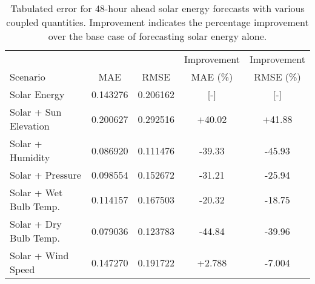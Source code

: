   \begin{table*}[t]
    \centering
    \caption{Tabulated error for 48-hour ahead solar energy forecasts with various coupled quantities. Improvement indicates the percentage improvement over the base case of forecasting solar energy alone.}
    \label{tab:solar48}
    \begin{tabular}{l|c|c|c|c}
      &  & & Improvement & Improvement \\
      Scenario  & MAE & RMSE & MAE (\%) & RMSE (\%)\\
      \hline
      Solar Energy & 0.143276 & 0.206162 & [-] & [-] \\
      Solar + Sun Elevation & 0.200627 & 0.292516 & +40.02 & +41.88\\
      Solar + Humidity & 0.086920 & 0.111476 & -39.33& -45.93\\
      Solar + Pressure & 0.098554 & 0.152672 &-31.21& -25.94\\
      Solar + Wet Bulb Temp. & 0.114157 & 0.167503 & -20.32& -18.75\\
      Solar + Dry Bulb Temp. & 0.079036 & 0.123783 & -44.84& -39.96\\
      Solar + Wind Speed & 0.147270 & 0.191722 & +2.788& -7.004\\
    \end{tabular}
  \end{table*}

